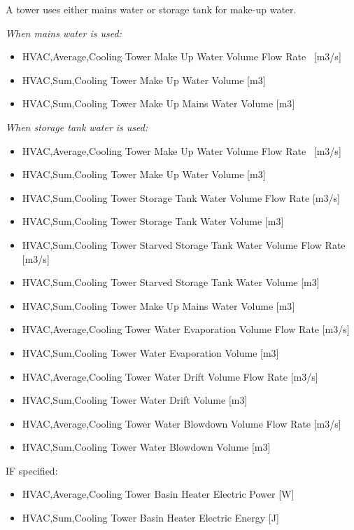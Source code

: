 A tower uses either mains water or storage tank for make-up water.

\emph{When mains water is used:}

\begin{itemize}
\item
  HVAC,Average,Cooling Tower Make Up Water Volume Flow Rate~ {[}m3/s{]}
\item
  HVAC,Sum,Cooling Tower Make Up Water Volume {[}m3{]}
\item
  HVAC,Sum,Cooling Tower Make Up Mains Water Volume {[}m3{]}
\end{itemize}

\emph{When storage tank water is used:}

\begin{itemize}
\item
  HVAC,Average,Cooling Tower Make Up Water Volume Flow Rate~ {[}m3/s{]}
\item
  HVAC,Sum,Cooling Tower Make Up Water Volume {[}m3{]}
\item
  HVAC,Sum,Cooling Tower Storage Tank Water Volume Flow Rate {[}m3/s{]}
\item
  HVAC,Sum,Cooling Tower Storage Tank Water Volume {[}m3{]}
\item
  HVAC,Sum,Cooling Tower Starved Storage Tank Water Volume Flow Rate {[}m3/s{]}
\item
  HVAC,Sum,Cooling Tower Starved Storage Tank Water Volume {[}m3{]}
\item
  HVAC,Sum,Cooling Tower Make Up Mains Water Volume {[}m3{]}
\item
  HVAC,Average,Cooling Tower Water Evaporation Volume Flow Rate {[}m3/s{]}
\item
  HVAC,Sum,Cooling Tower Water Evaporation Volume {[}m3{]}
\item
  HVAC,Average,Cooling Tower Water Drift Volume Flow Rate {[}m3/s{]}
\item
  HVAC,Sum,Cooling Tower Water Drift Volume {[}m3{]}
\item
  HVAC,Average,Cooling Tower Water Blowdown Volume Flow Rate {[}m3/s{]}
\item
  HVAC,Sum,Cooling Tower Water Blowdown Volume {[}m3{]}
\end{itemize}

IF specified:

\begin{itemize}
\item
  HVAC,Average,Cooling Tower Basin Heater Electric Power {[}W{]}
\item
  HVAC,Sum,Cooling Tower Basin Heater Electric Energy {[}J{]}
\end{itemize}

